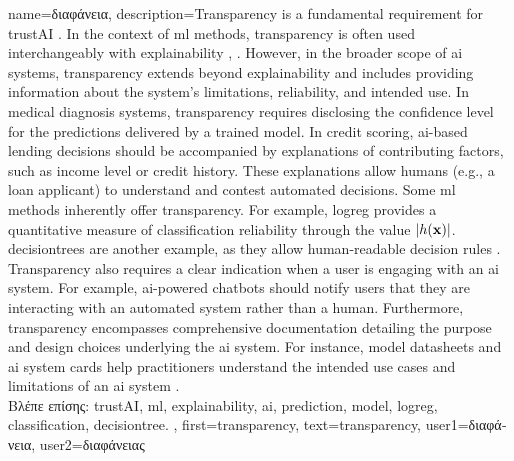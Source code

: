 {name={\foreignlanguage{greek}{διαφάνεια}},
	description={Transparency is a fundamental requirement for 
		\gls{trustAI} \cite{HLEGTrustworhtyAI}. In the context of \gls{ml} 
		methods, transparency is often used interchangeably with \gls{explainability} 
		\cite{JunXML2020}, \cite{gallese2023ai}. However, in the broader scope of \gls{ai} 
		systems, transparency extends beyond \gls{explainability} and includes providing information 
		about the system’s limitations, reliability, and intended use. 
		In medical diagnosis systems, transparency requires disclosing the confidence level 
		for the \gls{prediction}s delivered by a trained \gls{model}. In credit scoring, 
		\gls{ai}-based lending decisions should be accompanied by explanations of 
		contributing factors, such as income level or credit history. These explanations 
		allow humans (e.g., a loan applicant) to understand and contest automated decisions. 
		Some \gls{ml} methods inherently offer transparency. For example, \gls{logreg} 
		provides a quantitative measure of \gls{classification} reliability through the value $|h({\bf x})|$. 
		\Gls{decisiontree}s are another example, as they allow human-readable decision rules \cite{rudin2019stop}.
		Transparency also requires a clear indication when a user is engaging with an \gls{ai} system. 
		For example, \gls{ai}-powered chatbots should notify users that they are interacting with an 
		automated system rather than a human. Furthermore, transparency encompasses comprehensive 
		documentation detailing the purpose and design choices underlying the \gls{ai} system. 
		For instance, \gls{model} datasheets \cite{DatasheetData2021} and \gls{ai} system cards \cite{10.1145/3287560.3287596} 
		help practitioners understand the intended use cases and limitations of an \gls{ai} system \cite{Shahriari2017}.\\
		\foreignlanguage{greek}{Βλέπε επίσης:} \gls{trustAI}, \gls{ml}, \gls{explainability}, \gls{ai}, \gls{prediction}, \gls{model}, \gls{logreg}, \gls{classification}, \gls{decisiontree}. },
	first={transparency}, 
	text={transparency},
	user1={\foreignlanguage{greek}{διαφάνεια}}, %
    	user2={\foreignlanguage{greek}{διαφάνειας}} %
}

